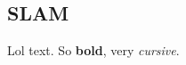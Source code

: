 \documentclass[Main]{subfiles}
\begin{document}
\subsection{SLAM} %
	\label{sec:slam}

	Lol text.
	So \textbf{bold}, very \emph{cursive}.

\end{document}
